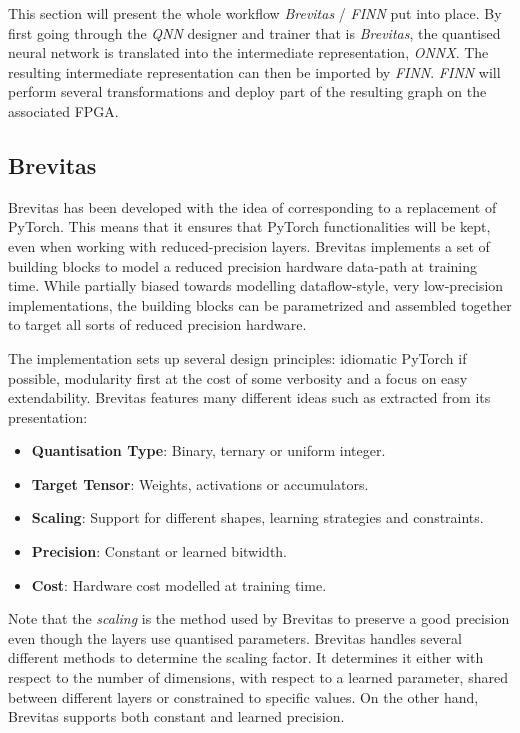 This section will present the whole workflow \emph{Brevitas} / \emph{FINN} put into place. By first going through the \emph{QNN} designer and trainer that is \emph{Brevitas}, the quantised neural network is translated into the intermediate representation, \emph{ONNX}. The resulting intermediate representation can then be imported by \emph{FINN}. \emph{FINN} will perform several transformations and deploy part of the resulting graph on the associated FPGA.


\subsection{Brevitas}

Brevitas has been developed with the idea of corresponding to a  replacement of PyTorch. This means that it ensures that PyTorch functionalities will be kept, even when working with reduced-precision layers. Brevitas implements a set of building blocks to model a reduced precision hardware data-path at training time. While partially biased towards modelling dataflow-style, very low-precision implementations, the building blocks can be parametrized and assembled together to target all sorts of reduced precision hardware.

The implementation sets up several design principles: idiomatic PyTorch if possible, modularity first at the cost of some verbosity and a focus on easy extendability. Brevitas features many different ideas such as extracted from its presentation:
\begin{itemize}
  \item \textbf{Quantisation Type}: Binary, ternary or uniform integer.
  \item \textbf{Target Tensor}: Weights, activations or accumulators.
  \item \textbf{Scaling}: Support for different shapes, learning strategies and constraints.
  \item \textbf{Precision}: Constant or learned bitwidth.
  \item \textbf{Cost}: Hardware cost modelled at training time.
\end{itemize}

Note that the \emph{scaling} is the method used by Brevitas to preserve a good precision even though the layers use quantised parameters. Brevitas handles several different methods to determine the scaling factor. It determines it either with respect to the number of dimensions, with respect to a learned parameter, shared between different layers or constrained to specific values. On the other hand, Brevitas supports both constant and learned precision.

